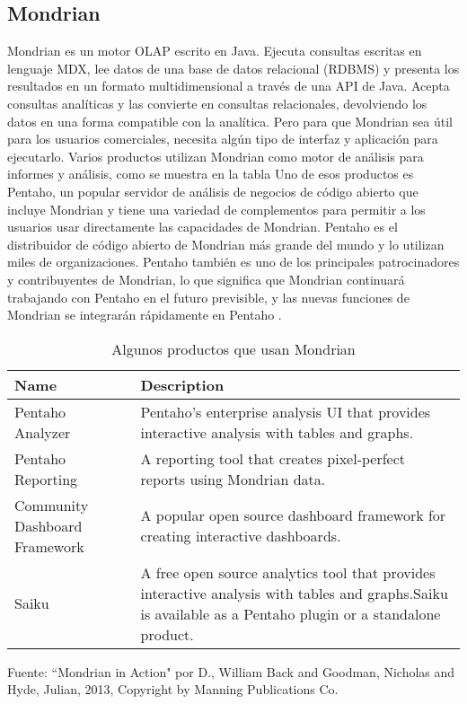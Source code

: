 \begin{spacing}{1.5}
	\subsection{Mondrian}
			Mondrian es un motor OLAP escrito en Java. Ejecuta consultas escritas en lenguaje MDX, lee datos de una base de datos relacional (RDBMS) y presenta los resultados en un formato multidimensional a través de una API de Java. Acepta consultas analíticas y las convierte en consultas relacionales, devolviendo los datos en una forma compatible con la analítica. Pero para que Mondrian sea útil para los usuarios comerciales, necesita algún tipo de interfaz y aplicación para ejecutarlo.
			Varios productos utilizan Mondrian como motor de análisis para informes y análisis, como se muestra en la tabla  Uno de esos productos es Pentaho, un popular servidor de análisis de negocios de código abierto que incluye Mondrian y tiene una variedad de complementos para permitir a los usuarios usar directamente las capacidades de Mondrian. Pentaho es el distribuidor de código abierto de Mondrian más grande del mundo y lo utilizan miles de organizaciones. Pentaho también es uno de los principales patrocinadores y contribuyentes de Mondrian, lo que significa que Mondrian continuará trabajando con Pentaho en el futuro previsible, y las nuevas funciones de Mondrian se integrarán rápidamente en Pentaho \cite{chap2_mondrian_action}.
			\begin{table}[H]
				\small
				\begin{tabular}{ |p{3cm}|p{12cm|}| }
					\hline
					\rowcolor[HTML]{CBCEFB} 
					Name & Description\\ \hline
					Pentaho Analyzer&Pentaho’s enterprise analysis UI that provides interactive analysis with tables and graphs.\\\hline
					Pentaho Reporting&A reporting tool that creates pixel-perfect reports using Mondrian data.\\ \hline
					Community Dashboard Framework&A popular open source dashboard framework for creating interactive dashboards.\\\hline
					Saiku&A free open source analytics tool that provides interactive analysis with tables and graphs.Saiku is available as a Pentaho plugin or a standalone product.\\ \hline
				\end{tabular}
			\caption{Algunos productos que usan Mondrian}
			\small {Fuente: ``Mondrian in Action" por D., William Back and Goodman, Nicholas and Hyde, Julian, 2013, Copyright by Manning Publications Co.}
			\label{table:1}
			\end{table}
		

\end{spacing}
